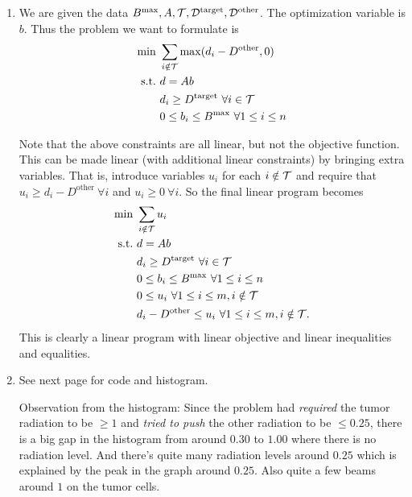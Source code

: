 \newpage

\pb

\soln
\begin{enumerate}[leftmargin=*]
\item We are given the data $B^{\max}, A,\cal T, D^{\text{target}}, D^{\text{other}}$. %
The optimization variable is $b$. Thus the problem we want to formulate is 
\begin{equation}
\begin{aligned}
\min &~\sum_{i\notin \cal T} \max(d_{i}-D^{\text{other}},0)\\
\text{s.t.} &~d = Ab\\
&~ d_{i}\ge D^{\text{target}}~\forall i\in\cal T\\
&~ 0\le b_{i} \le B^{\max} ~\forall 1\le i\le n
\end{aligned}
\end{equation}

Note that the above constraints are all linear, but not the objective function. This can be made linear (with additional linear constraints) by bringing extra variables. That is, introduce variables $u_{i}$ for each $i\notin \cal T$ and require that $u_{i}\ge d_{i}-D^{\text{other}}~\forall i$ and $u_{i}\ge 0~\forall i$. So the final linear program becomes 
\begin{equation}
\begin{aligned}
\min &~\sum_{i\notin \cal T} u_{i}\\
\text{s.t.} &~d = Ab\\
&~ d_{i}\ge D^{\text{target}}~\forall i\in\cal T\\
&~ 0\le b_{i} \le B^{\max} ~\forall 1\le i\le n\\
&~0\le u_{i} ~\forall 1\le i\le m, i\notin \cal T\\
&~d_{i}-D^{\text{other}} \le u_{i} ~\forall 1\le i\le m, i\notin \cal T.
\end{aligned}
\end{equation}
This is clearly a linear program with linear objective and linear inequalities and equalities.
\item See next page for code and histogram. 

Observation from the histogram: Since the problem had \textit{required} the tumor radiation to be $\ge 1$ and \textit{tried to push} the other radiation to be $\le 0.25$, there is a big gap in the histogram from around $0.30$ to $1.00$ where there is no radiation level. And there's quite many radiation levels around $0.25$ which is explained by the peak in the graph around $0.25$. Also quite a few beams around $1$ on the tumor cells.

\end{enumerate}

